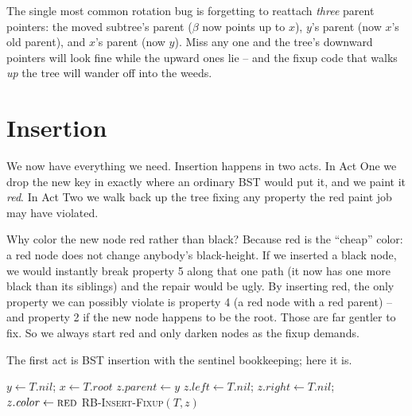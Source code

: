 \begin{trapbox}
The single most common rotation bug is forgetting to reattach \emph{three}
parent pointers: the moved subtree's parent ($\beta$ now points up to $x$), $y$'s
parent (now $x$'s old parent), and $x$'s parent (now $y$). Miss any one and the
tree's downward pointers will look fine while the upward ones lie -- and the
fixup code that walks \emph{up} the tree will wander off into the weeds.
\end{trapbox}

\section{Insertion}

We now have everything we need. Insertion happens in two acts. In Act One we drop
the new key in exactly where an ordinary BST would put it, and we paint it
\emph{red}. In Act Two we walk back up the tree fixing any property the red paint
job may have violated.

\begin{intuitionbox}
Why color the new node red rather than black? Because red is the ``cheap'' color:
a red node does not change anybody's black-height. If we inserted a black node, we
would instantly break property 5 along that one path (it now has one more black
than its siblings) and the repair would be ugly. By inserting red, the only
property we can possibly violate is property 4 (a red node with a red parent) --
and property 2 if the new node happens to be the root. Those are far gentler to
fix. So we always start red and only darken nodes as the fixup demands.
\end{intuitionbox}

The first act is BST insertion with the sentinel bookkeeping; here it is.

\begin{algorithm}[H]
\caption{\textsc{RB-Insert}$(T, z)$}
$y \gets T.\mathit{nil}$; \quad $x \gets T.\mathit{root}$\;
$z.\mathit{parent} \gets y$\;
$z.\mathit{left} \gets T.\mathit{nil}$; \quad $z.\mathit{right} \gets T.\mathit{nil}$; \quad $z.\mathit{color} \gets \textsc{red}$\;
\textsc{RB-Insert-Fixup}$(T, z)$\;
\end{algorithm}

